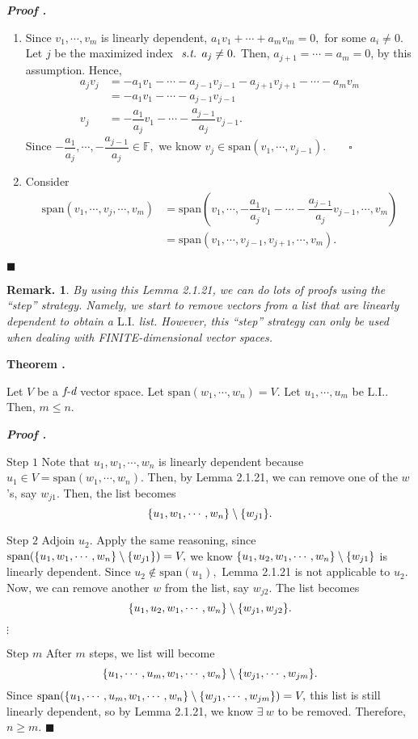 \documentclass[11pt, letterpaper]{article}
\newcounter{index}[subsection]
\newenvironment*{thm}[1]{\begin{tcolorbox}\par\noindent\textbf{Theorem \thesubsection.\stepcounter{index}\theindex\ #1} \par}{\par\end{tcolorbox}}
\newcounter{nprf}[subsection]
\newenvironment*{prf}{\par\indent\textbf{\textit{Proof \stepcounter{nprf}\thenprf.}}}{\hfill$\blacksquare$\par}
\newtheorem*{rmk}{Remark.}
\def\F{\mathbb{F}}
\def\st{\emph{ s.t. }}
\def\LI{\mathrm{L.I.}}
\def\FD{\emph{f-d}}
\def\span{\mathrm{span}}
\begin{document}
\begin{prf}
	\begin{enumerate}
		\item Since $v_1,\cdots,v_m$ is linearly dependent, $a_1v_1+\cdots+a_mv_m=0,$ for some $a_i\neq0.$ Let $j$ be the maximized index $\st a_j\neq0.$ Then, $a_{j+1}=\cdots=a_m=0$, by this assumption. Hence, \[\begin{aligned}a_jv_j&=-a_1v_1-\cdots-a_{j-1}v_{j-1}-a_{j+1}v_{j+1}-\cdots-a_mv_m\\&=-a_1v_1-\cdots-a_{j-1}v_{j-1}\\v_j&=-\dfrac{a_1}{a_j}v_1-\cdots-\dfrac{a_{j-1}}{a_j}v_{j-1}.\end{aligned}\] Since $-\dfrac{a_1}{a_j},\cdots,-\dfrac{a_{j-1}}{a_j}\in\F,$ we know $v_j\in\span(v_1,\cdots,v_{j-1}).\qquad\square$
		\item Consider \[\begin{aligned}\span(v_1,\cdots,v_j,\cdots,v_m)&=\span(v_1,\cdots,-\dfrac{a_1}{a_j}v_1-\cdots-\dfrac{a_{j-1}}{a_j}v_{j-1},\cdots,v_m)\\&=\span(v_1,\cdots,v_{j-1},v_{j+1},\cdots,v_m).\end{aligned}\]
	\end{enumerate}	
\end{prf}
\begin{rmk}
	By using this Lemma 2.1.21, we can do lots of proofs using the ``step'' strategy. Namely, we start to remove vectors from a list that are linearly dependent to obtain a $\LI$ list. However, this ``step'' strategy can only be used when dealing with FINITE-dimensional vector spaces. 
\end{rmk}
\begin{thm}{}
	Let $V$ be a $\FD$ vector space. Let $\span(w_1,\cdots,w_n)=V.$ Let $u_1,\cdots,u_m$ be $\LI.$ Then, $m\leq n.$
\end{thm}
\begin{prf}
	\par $\boxed{\text{Step }1}$ Note that $u_1,w_1,\cdots,w_n$ is linearly dependent because $u_1\in V=\span(w_1,\cdots,w_n).$ Then, by Lemma 2.1.21, we can remove one of the $w$'s, say $w_{j1}$. Then, the list becomes \[\qty{u_1,w_1,\cdots,w_n}\setminus\qty{w_{j1}}.\]\par 
	$\boxed{\text{Step }2}$ Adjoin $u_2.$ Apply the same reasoning, since $\span\qty(\qty{u_1,w_1,\cdots,w_n}\setminus\qty{w_{j1}})=V,$ we know $\qty{u_1,u_2,w_1,\cdots,w_n}\setminus\qty{w_{j1}}$ is linearly dependent. Since $u_2\notin\span(u_1),$ Lemma 2.1.21 is not applicable to $u_2$. Now, we can remove another $w$ from the list, say $w_{j2}.$ The list becomes \[\qty{u_1,u_2,w_1,\cdots,w_n}\setminus\qty{w_{j1},w_{j2}}.\]\par\indent\indent$\vdots$\par 
	$\boxed{\text{Step }m}$ After $m$ steps, we list will become \[\qty{u_1,\cdots,u_m,w_1,\cdots,w_n}\setminus\qty{w_{j1},\cdots,w_{jm}}.\] Since $\span(\qty{u_1,\cdots,u_m,w_1,\cdots,w_n}\setminus\qty{w_{j1},\cdots,w_{jm}})=V,$ this list is still linearly dependent, so by Lemma 2.1.21, we know $\exists\ w$ to be removed. Therefore, $n\geq m.$
\end{prf}
\end{document}
